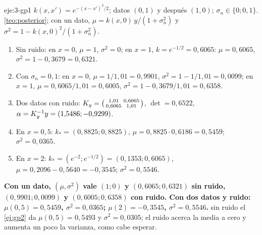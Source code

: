 \begin{solucion}{eje:3-gp1}
\datos $k(x,x')=e^{-(x-x')^2/2}$; datos $(0,1)$ y después $(1,0)$; $\sigma_n\in\{0;0{,}1\}$.
\planteamiento \cref{teo:posterior}; con un dato, $\mu=k(x,0)\,y/(1+\sigma_n^2)$ y $\sigma^2=1-k(x,0)^2/(1+\sigma_n^2)$.
\pasos
\begin{enumerate}[label=\arabic*.]
  \item Sin ruido: en $x=0$, $\mu=1$, $\sigma^2=0$; en $x=1$, $k=e^{-1/2}=0{,}6065$: $\mu=0{,}6065$, $\sigma^2=1-0{,}3679=0{,}6321$.
  \item Con $\sigma_n=0{,}1$: en $x=0$, $\mu=1/1{,}01=0{,}9901$, $\sigma^2=1-1/1{,}01=0{,}0099$; en $x=1$, $\mu=0{,}6065/1{,}01=0{,}6005$, $\sigma^2=1-0{,}3679/1{,}01=0{,}6358$.
  \item Dos datos con ruido: $K_{y}=\bigl(\begin{smallmatrix}1{,}01&0{,}6065\\0{,}6065&1{,}01\end{smallmatrix}\bigr)$, $\det=0{,}6522$, $\alpha=K_{y}^{-1}y=(1{,}5486;-0{,}9299)$.
  \item En $x=0{,}5$: $k_*=(0{,}8825;0{,}8825)$, $\mu=0{,}8825\cdot0{,}6186=0{,}5459$; $\sigma^2=0{,}0365$.
  \item En $x=2$: $k_*=(e^{-2};e^{-1/2})=(0{,}1353;0{,}6065)$, $\mu=0{,}2096-0{,}5640=-0{,}3545$; $\sigma^2=0{,}5546$.
\end{enumerate}
\resultado \textbf{Con un dato, $(\mu,\sigma^2)$ vale $(1;0)$ y $(0{,}6065;0{,}6321)$ sin ruido, $(0{,}9901;0{,}0099)$ y $(0{,}6005;0{,}6358)$ con ruido. Con dos datos y ruido: $\mu(0{,}5)=0{,}5459$, $\sigma^2=0{,}0365$; $\mu(2)=-0{,}3545$, $\sigma^2=0{,}5546$.}
\comprobacion sin ruido el \cref{ej:gp2} da $\mu(0{,}5)=0{,}5493$ y $\sigma^2=0{,}0305$; el ruido acerca la media a cero y aumenta un poco la varianza, como cabe esperar.
\end{solucion}


